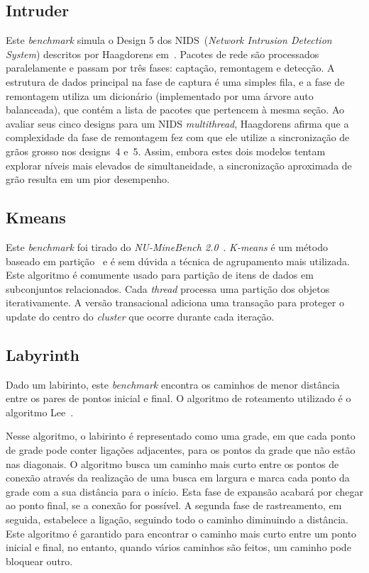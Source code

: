 \documentclass[diss,capa]{texufpel}
\begin{document}
\subsection{Intruder}

Este \emph{benchmark} simula o Design 5 dos NIDS~(\emph{Network Intrusion Detection System}) descritos por Haagdorens em~\cite{Haagdorens05}. Pacotes de rede são processados paralelamente e passam por três fases: captação, remontagem e detecção. A estrutura de dados principal na fase de captura é uma simples fila, e a fase de remontagem utiliza um dicionário (implementado por uma árvore auto balanceada), que contém a lista de pacotes que pertencem à mesma seção. Ao avaliar seus cinco designs para um NIDS \emph{multithread}, Haagdorens afirma que a complexidade da fase de remontagem fez com que ele utilize a sincronização de grãos grosso nos designs~4 e~5. Assim, embora estes dois modelos tentam explorar níveis mais elevados de simultaneidade, a sincronização aproximada de grão resulta em um pior desempenho.


\subsection{Kmeans}

Este \emph{benchmark} foi tirado do \emph{NU-MineBench 2.0}~\cite{Pisharath05}. \emph{K-means} é um método baseado em partição~\cite{Bezdek81} e é sem dúvida a técnica de agrupamento mais utilizada. Este algoritmo é comumente usado para partição de itens de dados em subconjuntos relacionados. Cada \emph{thread} processa uma partição dos objetos iterativamente. A versão transacional adiciona uma transação para proteger o update do centro do \emph{cluster} que ocorre durante cada iteração.


\subsection{Labyrinth}

Dado um labirinto, este \emph{benchmark} encontra os caminhos de menor distância entre os pares de pontos inicial e final. O algoritmo de roteamento utilizado é o algoritmo Lee~\cite{Lee61}.

Nesse algoritmo, o labirinto é representado como uma grade, em que cada ponto de grade pode conter ligações adjacentes, para os pontos da grade que não estão nas diagonais. O algoritmo busca um caminho mais curto entre os pontos de conexão através da realização de uma busca em largura e marca cada ponto da grade com a sua distância para o início. Esta fase de expansão acabará por chegar ao ponto final, se a conexão for possível. A segunda fase de rastreamento, em seguida, estabelece a ligação, seguindo todo o caminho diminuindo a distância. Este algoritmo é garantido para encontrar o caminho mais curto entre um ponto inicial e final, no entanto, quando vários caminhos são feitos, um caminho pode bloquear outro.
\end{document}
